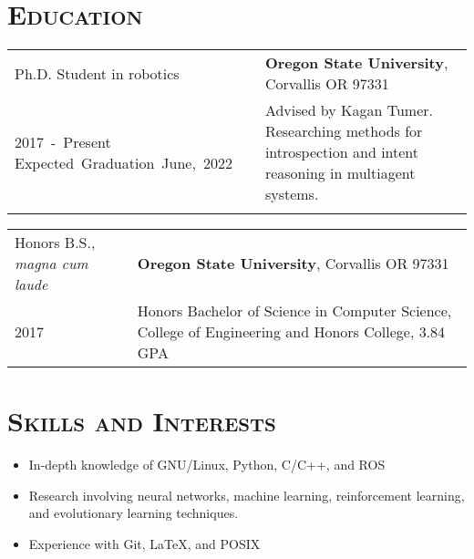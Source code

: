 \documentclass[letterpaper,10pt,titlepage]{article}
\newcommand{\leftW}{0.28\textwidth}
\begin{document}
\pagestyle{empty}%
\par{\par}

\section*{\textsc{Education}}
\begin{tabularx}{\textwidth}{p{\leftW}X}
	Ph.D. Student in robotics & \textbf{Oregon State University}, Corvallis OR 97331\\

	\mbox{2017 - Present} \mbox{Expected Graduation June, 2022}& Advised by Kagan Tumer. Researching methods for introspection and intent reasoning in multiagent systems.\\
	 &\\
\end{tabularx}
\begin{tabularx}{\textwidth}{p{\leftW}X}
	Honors B.S., \textit{magna cum laude} & \textbf{Oregon State University}, Corvallis OR 97331\\
	2017 & Honors Bachelor of Science in Computer Science, College of Engineering and Honors College, 3.84 GPA \\
\end{tabularx}

\section*{\textsc{Skills and Interests}}
\begin{itemize} \itemsep1pt \parskip0pt 
\item In-depth knowledge of GNU/Linux, Python, C/C++, and ROS
\item Research involving neural networks, machine learning, reinforcement learning, and evolutionary learning techniques.
\item Experience with Git, \LaTeX, and POSIX
\end{itemize}
\end{document}
